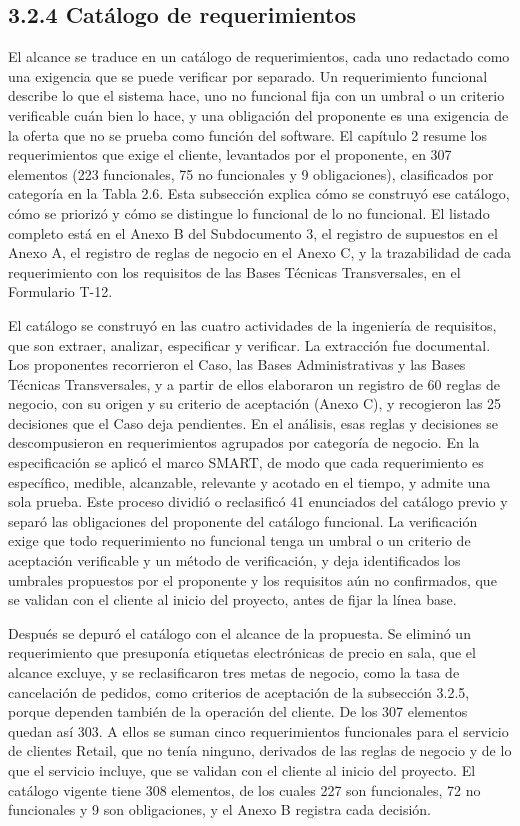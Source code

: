 \documentclass[11pt]{article}
\begin{document}
\subsection{3.2.4 Catálogo de requerimientos}

El alcance se traduce en un catálogo de requerimientos, cada uno redactado como una exigencia que se puede verificar por separado. Un requerimiento funcional describe lo que el sistema hace, uno no funcional fija con un umbral o un criterio verificable cuán bien lo hace, y una obligación del proponente es una exigencia de la oferta que no se prueba como función del software. El capítulo 2 resume los requerimientos que exige el cliente, levantados por el proponente, en 307 elementos (223 funcionales, 75 no funcionales y 9 obligaciones), clasificados por categoría en la Tabla 2.6. Esta subsección explica cómo se construyó ese catálogo, cómo se priorizó y cómo se distingue lo funcional de lo no funcional. El listado completo está en el Anexo B del Subdocumento 3, el registro de supuestos en el Anexo A, el registro de reglas de negocio en el Anexo C, y la trazabilidad de cada requerimiento con los requisitos de las Bases Técnicas Transversales, en el Formulario T-12.

El catálogo se construyó en las cuatro actividades de la ingeniería de requisitos, que son extraer, analizar, especificar y verificar. La extracción fue documental. Los proponentes recorrieron el Caso, las Bases Administrativas y las Bases Técnicas Transversales, y a partir de ellos elaboraron un registro de 60 reglas de negocio, con su origen y su criterio de aceptación (Anexo C), y recogieron las 25 decisiones que el Caso deja pendientes. En el análisis, esas reglas y decisiones se descompusieron en requerimientos agrupados por categoría de negocio. En la especificación se aplicó el marco SMART, de modo que cada requerimiento es específico, medible, alcanzable, relevante y acotado en el tiempo, y admite una sola prueba. Este proceso dividió o reclasificó 41 enunciados del catálogo previo y separó las obligaciones del proponente del catálogo funcional. La verificación exige que todo requerimiento no funcional tenga un umbral o un criterio de aceptación verificable y un método de verificación, y deja identificados los umbrales propuestos por el proponente y los requisitos aún no confirmados, que se validan con el cliente al inicio del proyecto, antes de fijar la línea base.

Después se depuró el catálogo con el alcance de la propuesta. Se eliminó un requerimiento que presuponía etiquetas electrónicas de precio en sala, que el alcance excluye, y se reclasificaron tres metas de negocio, como la tasa de cancelación de pedidos, como criterios de aceptación de la subsección 3.2.5, porque dependen también de la operación del cliente. De los 307 elementos quedan así 303. A ellos se suman cinco requerimientos funcionales para el servicio de clientes Retail, que no tenía ninguno, derivados de las reglas de negocio y de lo que el servicio incluye, que se validan con el cliente al inicio del proyecto. El catálogo vigente tiene 308 elementos, de los cuales 227 son funcionales, 72 no funcionales y 9 son obligaciones, y el Anexo B registra cada decisión.
\end{document}
